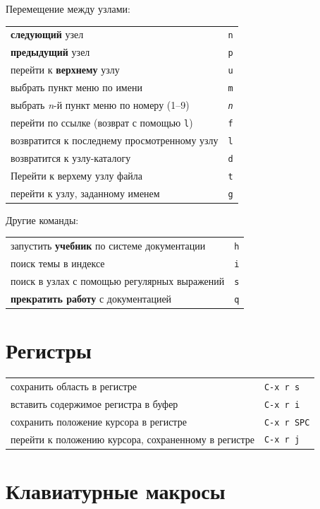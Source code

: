 \documentclass[10pt]{article}
\newlength{\ColWidth}
\newcommand{\kbd}[1]{\texttt{#1}}
\begin{document}
Перемещение между узлами:

\begin{tabular}{p{\ColWidth}l}
{\bf следующий} узел & \kbd{n} \\
{\bf предыдущий} узел & \kbd{p} \\
перейти к {\bf верхнему} узлу & \kbd{u} \\
выбрать пункт меню по имени & \kbd{m} \\
выбрать {\it n\/}-й пункт меню по номеру (1--9) & \kbd{{\it n}} \\
перейти по ссылке (возврат с помощью \kbd{l}) & \kbd{f} \\
возвратится к последнему просмотренному узлу & \kbd{l} \\
возвратится к узлу-каталогу & \kbd{d} \\
Перейти к верхему узлу файла & \kbd{t} \\
перейти к узлу, заданному именем & \kbd{g} \\
\end{tabular}

Другие команды:

\begin{tabular}{p{\ColWidth}l}
запустить {\bf учебник} по системе документации & \kbd{h} \\
поиск темы в индексе & \kbd{i} \\
поиск в узлах с помощью регулярных выражений & \kbd{s} \\
{\bf прекратить работу} с документацией & \kbd{q} \\
\end{tabular}

\section{Регистры}

\begin{tabular}{p{\ColWidth}l}
сохранить область в регистре & \kbd{C-x r s} \\
вставить содержимое регистра в буфер & \kbd{C-x r i} \\

сохранить положение курсора в регистре & \kbd{C-x r SPC} \\
перейти к положению курсора, сохраненному в регистре & \kbd{C-x r j} \\
\end{tabular}

\section{Клавиатурные макросы}
\end{document}
